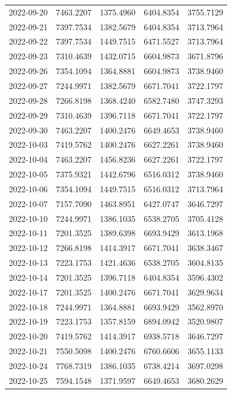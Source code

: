 {\begin{longtable}{lllll}
2022-09-20 & 7463.2207 & 1375.4960 & 6404.8354 & 3755.7129 \\
2022-09-21 & 7397.7534 & 1382.5679 & 6404.8354 & 3713.7964 \\
2022-09-22 & 7397.7534 & 1449.7515 & 6471.5527 & 3713.7964 \\
2022-09-23 & 7310.4639 & 1432.0715 & 6604.9873 & 3671.8796 \\
2022-09-26 & 7354.1094 & 1364.8881 & 6604.9873 & 3738.9460 \\
2022-09-27 & 7244.9971 & 1382.5679 & 6671.7041 & 3722.1797 \\
2022-09-28 & 7266.8198 & 1368.4240 & 6582.7480 & 3747.3293 \\
2022-09-29 & 7310.4639 & 1396.7118 & 6671.7041 & 3722.1797 \\
2022-09-30 & 7463.2207 & 1400.2476 & 6649.4653 & 3738.9460 \\
2022-10-03 & 7419.5762 & 1400.2476 & 6627.2261 & 3738.9460 \\
2022-10-04 & 7463.2207 & 1456.8236 & 6627.2261 & 3722.1797 \\
2022-10-05 & 7375.9321 & 1442.6796 & 6516.0312 & 3738.9460 \\
2022-10-06 & 7354.1094 & 1449.7515 & 6516.0312 & 3713.7964 \\
2022-10-07 & 7157.7090 & 1463.8951 & 6427.0747 & 3646.7297 \\
2022-10-10 & 7244.9971 & 1386.1035 & 6538.2705 & 3705.4128 \\
2022-10-11 & 7201.3525 & 1389.6398 & 6693.9429 & 3613.1968 \\
2022-10-12 & 7266.8198 & 1414.3917 & 6671.7041 & 3638.3467 \\
2022-10-13 & 7223.1753 & 1421.4636 & 6538.2705 & 3604.8135 \\
2022-10-14 & 7201.3525 & 1396.7118 & 6404.8354 & 3596.4302 \\
2022-10-17 & 7201.3525 & 1400.2476 & 6671.7041 & 3629.9634 \\
2022-10-18 & 7244.9971 & 1364.8881 & 6693.9429 & 3562.8970 \\
2022-10-19 & 7223.1753 & 1357.8159 & 6894.0942 & 3520.9807 \\
2022-10-20 & 7419.5762 & 1414.3917 & 6938.5718 & 3646.7297 \\
2022-10-21 & 7550.5098 & 1400.2476 & 6760.6606 & 3655.1133 \\
2022-10-24 & 7768.7319 & 1386.1035 & 6738.4214 & 3697.0298 \\
2022-10-25 & 7594.1548 & 1371.9597 & 6649.4653 & 3680.2629 \\

\end{longtable}}
